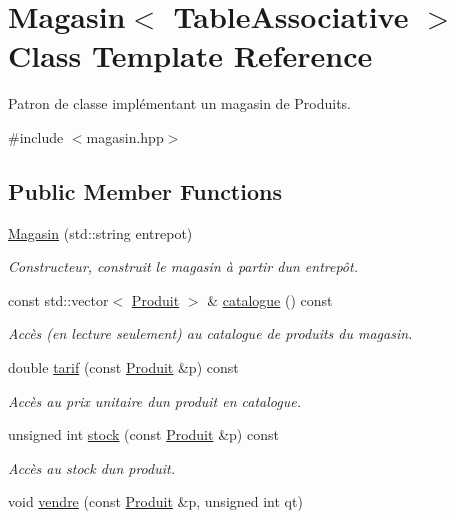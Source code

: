 \hypertarget{class_magasin}{}\section{Magasin$<$ Table\+Associative $>$ Class Template Reference}
\label{class_magasin}


Patron de classe implémentant un magasin de Produits.  




{\ttfamily \#include $<$magasin.\+hpp$>$}

\subsection*{Public Member Functions}
\begin{DoxyCompactItemize}
\item 
\hyperlink{class_magasin_a7f2bef14d6d884d2d68a7d4ec732a0e8}{Magasin} (std\+::string entrepot)
\begin{DoxyCompactList}\small\item\em Constructeur, construit le magasin à partir d\textquotesingle{}un entrepôt. \end{DoxyCompactList}\item 
const std\+::vector$<$ \hyperlink{class_produit}{Produit} $>$ \& \hyperlink{class_magasin_a7c08ae39d85b5ed27a7943cab6abbb5b}{catalogue} () const 
\begin{DoxyCompactList}\small\item\em Accès (en lecture seulement) au catalogue de produits du magasin. \end{DoxyCompactList}\item 
double \hyperlink{class_magasin_ac65a56398c0d534dfcd851a9e866445a}{tarif} (const \hyperlink{class_produit}{Produit} \&p) const 
\begin{DoxyCompactList}\small\item\em Accès au prix unitaire d\textquotesingle{}un produit en catalogue. \end{DoxyCompactList}\item 
unsigned int \hyperlink{class_magasin_ad1937ccac7657d152c69c9707b02dbc0}{stock} (const \hyperlink{class_produit}{Produit} \&p) const 
\begin{DoxyCompactList}\small\item\em Accès au stock d\textquotesingle{}un produit. \end{DoxyCompactList}\item 
void \hyperlink{class_magasin_a7971012fa641fb39bf5e1d9f45c212d8}{vendre} (const \hyperlink{class_produit}{Produit} \&p, unsigned int qt)

\end{DoxyCompactItemize}

